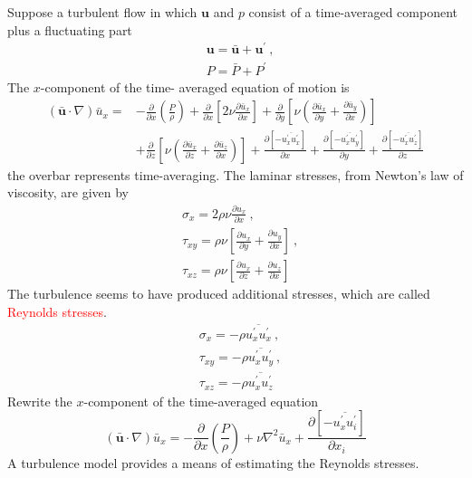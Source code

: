 \documentclass[12pt,a4paper]{article}
\renewcommand{\vec}[1]{\boldsymbol{#1}}
\begin{document}
Suppose a turbulent flow in which $\vec{u}$ and $p$ consist of a time-averaged component plus a fluctuating part
\begin{align}
& \vec{u} = \bar{\vec{u} } +\vec{u}^\prime ~, \\
& P = \bar{P} +P^\prime 
\end{align}
The $x$-component of the time- averaged equation of motion is
\begin{align*}
(\bar{\vec{u}} \cdot \nabla) \bar{u}_x = &-\frac{\partial }{\partial x} \left(\frac{P}{\rho} \right) +\frac{\partial }{\partial x} \left[2\nu \frac{\partial \bar{u}_x}{\partial x}  \right] +\frac{\partial }{\partial y} \left[\nu \left(\frac{\partial \bar{u}_x}{\partial y} +\frac{\partial \bar{u}_y}{\partial x} \right) \right] \\
& +\frac{\partial }{\partial z} \left[\nu \left(\frac{\partial \bar{u}_x}{\partial z} +\frac{\partial \bar{u}_z}{\partial x} \right) \right] +\frac{\partial [-\overline{u_x^\prime u_x^\prime} ]}{\partial x} +\frac{\partial [-\overline{u_x^\prime u_y^\prime} ]}{\partial y} +\frac{\partial [-\overline{u_x^\prime u_z^\prime} ]}{\partial z}
\end{align*}
the overbar represents time-averaging. The laminar stresses, from Newton's law of viscosity, are given by
\begin{align*}
& \sigma_x = 2\rho \nu \frac{\partial u_x}{\partial x} ~, \\
& \tau_{xy} = \rho \nu \left[\frac{\partial u_x}{\partial y} +\frac{\partial u_y}{\partial x} \right] ~, \\
& \tau_{xz} = \rho \nu \left[\frac{\partial u_x}{\partial z} +\frac{\partial u_z}{\partial x} \right] 
\end{align*}
The turbulence seems to have produced additional stresses, which are called \textcolor{red}{Reynolds stresses}.
\begin{align*}
& \sigma_x = -\rho \overline{u_x^\prime u_x^\prime} ~, \\
& \tau_{xy} = -\rho \overline{u_x^\prime u_y^\prime} ~, \\
& \tau_{xz} = -\rho \overline{u_x^\prime u_z^\prime}
\end{align*}
Rewrite the $x$-component of the time-averaged equation
\begin{equation*}
(\bar{\vec{u}} \cdot \nabla) \bar{u}_x = -\frac{\partial }{\partial x} \left(\frac{P}{\rho} \right) +\nu \nabla^2 \bar{u}_x +\frac{\partial [-\overline{u_x^\prime u_i^\prime} ]}{\partial x_i}
\end{equation*}
A turbulence model provides a means of estimating the Reynolds stresses.
\end{document}
